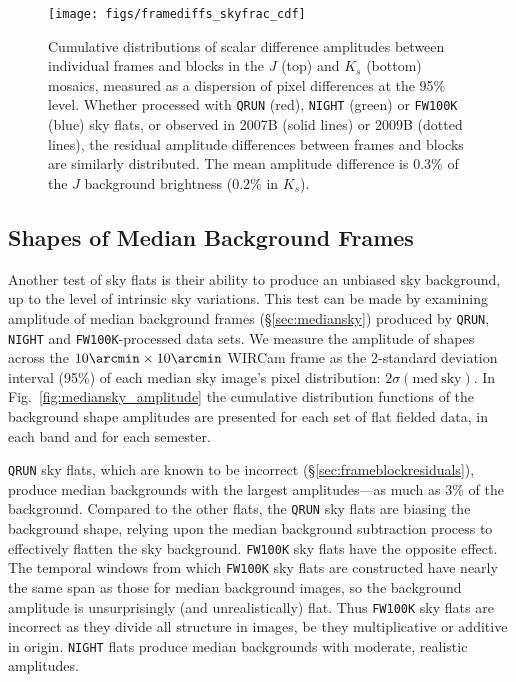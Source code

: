 \documentclass[iop,tighten]{emulateapj}
\newcommand{\mycomment}[1]{\textcolor{OliveGreen}{\textit{#1}}} %
\newcommand{\Fig}[1]{Fig.~\ref{fig:#1}}  %
\newcommand{\Sec}[1]{\S\ref{sec:#1}}  %
\begin{document}
\begin{figure}[t]
\centering
\texttt{[image: figs/framediffs\_skyfrac\_cdf]}
\caption{Cumulative distributions of scalar difference amplitudes between individual frames and blocks in the $J$ (top) and $K_s$ (bottom) mosaics, measured as a dispersion of pixel differences at the 95\% level.
  Whether processed with \texttt{QRUN} (red), \texttt{NIGHT} (green) or \texttt{FW100K} (blue) sky flats, or observed in 2007B (solid lines) or 2009B (dotted lines), the residual amplitude differences between frames and blocks are similarly distributed.
The mean amplitude difference is $0.3\%$ of the $J$ background brightness ($0.2\%$ in $K_s$).
}
\label{fig:frame_diffs_skyfrac}
\end{figure}


\subsection{Shapes of Median Background Frames}
\label{sec:medianskyshapes}

Another test of sky flats is their ability to produce an unbiased sky background, up to the level of intrinsic sky variations.
This test can be made by examining amplitude of median background frames (\Sec{mediansky}) produced by \texttt{QRUN}, \texttt{NIGHT} and \texttt{FW100K}-processed data sets.
We measure the amplitude of shapes across the $10\arcmin \times 10\arcmin$ WIRCam frame as the 2-standard deviation interval (95\%) of each median sky image's pixel distribution: $2 \sigma(\mathrm{med~sky})$.
In \Fig{mediansky_amplitude} the cumulative distribution functions of the background shape amplitudes are presented for each set of flat fielded data, in each band and for each semester.

\texttt{QRUN} sky flats, which are known to be incorrect (\Sec{frameblockresiduals}), produce median backgrounds with the largest amplitudes---as much as 3\% of the background.
Compared to the other flats, the \texttt{QRUN} sky flats are biasing the background shape, relying upon the median background subtraction process to effectively flatten the sky background.
\texttt{FW100K} sky flats have the opposite effect.
The temporal windows from which \texttt{FW100K} sky flats are constructed have nearly the same span as those for median background images, so the background amplitude is unsurprisingly (and unrealistically) flat.
Thus \texttt{FW100K} sky flats are incorrect as they divide all structure in images, be they multiplicative or additive in origin.
\texttt{NIGHT} flats produce median backgrounds with moderate, realistic amplitudes.
\end{document}
